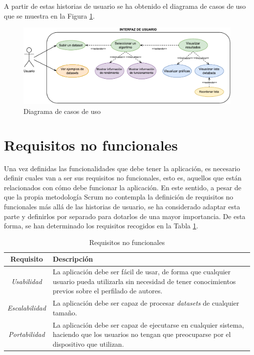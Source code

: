 A partir de estas historias de usuario se ha obtenido el diagrama de casos de uso que se muestra en la Figura
\ref{fig:casos_uso}.

\bigskip
\begin{figure}[H]
	\centering
	\includegraphics[width=\textwidth]{diagramas/usecases.pdf}
	\caption{Diagrama de casos de uso}
	\label{fig:casos_uso}
\end{figure}

\section{Requisitos no funcionales}
\label{sec:analisis_requisitos_no_funcionales}

Una vez definidas las funcionalidades que debe tener la aplicación, es necesario definir cuales van a ser sus requisitos
no funcionales, esto es, aquellos que están relacionados con cómo debe funcionar la aplicación. En este sentido, a pesar
de que la propia metodología Scrum no contempla la definición de requisitos no funcionales más allá de las historias de usuario,
se ha considerado adaptar esta parte y definirlos por separado para dotarlos de una mayor importancia.
De esta forma, se han determinado los requisitos recogidos en la Tabla \ref{tab:requisitos_no_funcionales}.

\bigskip
\begin{table}[hp!]
  \centering
  \begin{tabular}{|c|p{9.6cm}|}
		\rowcolor{udcpink!25}
		\hline
		\small \textbf{Requisito} & \small \textbf{Descripción} \\\hline
		\small \textit{Usabilidad} & \small La aplicación debe ser fácil de usar, de forma que cualquier usuario pueda utilizarla sin
		necesidad de tener conocimientos previos sobre el perfilado de autores. \\\hline
		\small \textit{Escalabilidad} & \small La aplicación debe ser capaz de procesar \textit{datasets} de cualquier tamaño.  \\\hline
		\small \textit{Portabilidad} & \small La aplicación debe ser capaz de ejecutarse en cualquier sistema, haciendo que
		los usuarios no tengan que preocuparse por el dispositivo que utilizan. \\\hline
  \end{tabular}
  \caption{Requisitos no funcionales}
  \label{tab:requisitos_no_funcionales}
\end{table}
